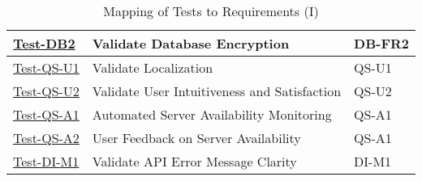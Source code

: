 \documentclass[12pt, titlepage]{article}
\begin{document}
\begin{table}[htpb!]
\begin{tabular}{|l|p{8cm}|p{3cm}|}
    \hline
    \hyperref[itm:Test-DB2]{Test-DB2}     & Validate Database Encryption                       & DB-FR2                \\
    \hline
    \hyperref[itm:Test-QS-U1]{Test-QS-U1} & Validate Localization                              & QS-U1                 \\
    \hline
    \hyperref[itm:Test-QS-U2]{Test-QS-U2} & Validate User Intuitiveness and Satisfaction       & QS-U2                 \\
    \hline
    \hyperref[itm:Test-QS-A1]{Test-QS-A1} & Automated Server Availability Monitoring           & QS-A1                 \\
    \hline
    \hyperref[itm:Test-QS-A2]{Test-QS-A2} & User Feedback on Server Availability               & QS-A1                 \\
    \hline
    \hyperref[itm:Test-DI-M1]{Test-DI-M1} & Validate API Error Message Clarity                 & DI-M1                 \\
    \hline
  \end{tabular}
  \caption{Mapping of Tests to Requirements (I)}
  \label{tab:test_requirements1}
\end{table}
\end{document}
